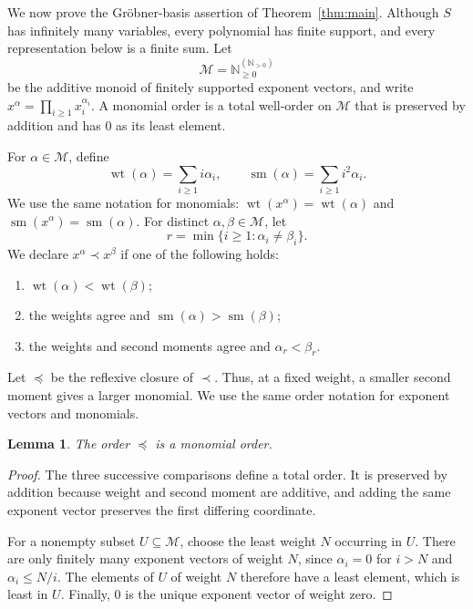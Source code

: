 \documentclass[11pt,reqno]{amsart}
\newtheorem{lemma}[theorem]{Lemma}
\theoremstyle{definition}
\theoremstyle{remark}
\theoremstyle{plain}
\newcommand{\M}{\ensuremath{\mathcal{M}}}
\newcommand{\NN}{\mathbb N}
\newcommand{\wt}{\operatorname{wt}}
\newcommand{\smom}{\operatorname{sm}}
\begin{document}
We now prove the Gr\"obner-basis assertion of
Theorem~\ref{thm:main}.  Although \(S\) has infinitely many variables,
every polynomial has finite support, and every representation below
is a finite sum.  Let
$$
 \M=\NN_{\geq0}^{(\NN_{>0})}
$$
be the additive monoid of finitely supported exponent vectors, and
write \(x^\alpha=\prod_{i\geq1}x_i^{\alpha_i}\).  A monomial order is
a total well-order on \(\M\) that is preserved by addition and has
\(0\) as its least element.

For \(\alpha\in\M\), define
\begin{equation}\label{eq:weight-moment}
 \wt(\alpha)=\sum_{i\geq1}i\alpha_i,
 \qquad
 \smom(\alpha)=\sum_{i\geq1}i^2\alpha_i.
\end{equation}
We use the same notation for monomials:
\(\wt(x^\alpha)=\wt(\alpha)\) and
\(\smom(x^\alpha)=\smom(\alpha)\).
For distinct \(\alpha,\beta\in\M\), let
$$
 r=\min\{i\geq1:\alpha_i\neq\beta_i\}.
$$
We declare \(x^\alpha\prec x^\beta\) if one of the following holds:
\begin{enumerate}[label=(\roman*),leftmargin=2.2em,itemsep=1pt]
\item \(\wt(\alpha)<\wt(\beta)\);
\item the weights agree and \(\smom(\alpha)>\smom(\beta)\);
\item the weights and second moments agree and
      \(\alpha_r<\beta_r\).
\end{enumerate}
Let \(\preceq\) be the reflexive closure of \(\prec\).  Thus, at a
fixed weight, a smaller second moment gives a larger monomial.
We use the same order notation for exponent vectors and monomials.

\begin{lemma}\label{lem:monomial-order}
The order \(\preceq\) is a monomial order.
\end{lemma}

\begin{proof}
The three successive comparisons define a total order.  It is
preserved by addition because weight and second moment are additive,
and adding the same exponent vector preserves the first differing
coordinate.

For a nonempty subset \(U\subseteq\M\), choose the least weight \(N\)
occurring in \(U\).  There are only finitely many exponent vectors of
weight \(N\), since \(\alpha_i=0\) for \(i>N\) and
\(\alpha_i\leq N/i\).  The elements of \(U\) of weight \(N\)
therefore have a least element, which is least in \(U\).
Finally, \(0\) is the unique exponent vector of weight zero.
\end{proof}
\end{document}
